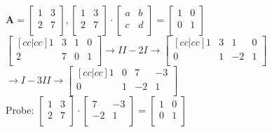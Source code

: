 \documentclass[../main.tex]{subfiles}
\begin{document}
$\mathbf{A}=
\begin{bmatrix}
    1 & 3 \\
    2 & 7 \\
\end{bmatrix}, 
\begin{bmatrix}
    1 & 3 \\
    2 & 7 \\
\end{bmatrix} \cdot
\begin{bmatrix}
    a & b \\
    c & d \\
\end{bmatrix} =
\begin{bmatrix}
    1 & 0 \\
    0 & 1 \\
\end{bmatrix}$ \\ [7pt]

$\begin{bmatrix}[cc|cc]
    1 & 3 & 1 & 0 \\
    2 & 7 & 0 & 1 \\
\end{bmatrix} \rightarrow II - 2I \rightarrow
\begin{bmatrix}[cc|cc]
    1 & 3 & 1 & 0 \\
    0 & 1 & -2 & 1 \\
\end{bmatrix}$ \\ [7pt]

$ \rightarrow I - 3II \rightarrow
\begin{bmatrix}[cc|cc]
    1 & 0 & 7 & -3 \\
    0 & 1 & -2 & 1 \\
\end{bmatrix}$ \\ [7pt]
Probe: 
$\begin{bmatrix}
    1 & 3 \\
    2 & 7 \\
\end{bmatrix} \cdot
\begin{bmatrix}
    7 & -3 \\
    -2 & 1 \\
\end{bmatrix} =
\begin{bmatrix}
    1 & 0 \\
    0 & 1 \\
\end{bmatrix}$
\end{document}

